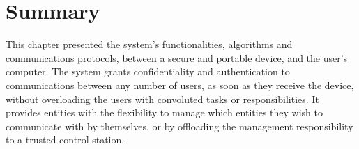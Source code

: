 


\section{Summary}\label{chap:arch:summary}

This chapter presented the system's functionalities, algorithms and communications protocols, between a secure and portable device, and the user's computer.
The system grants confidentiality and authentication to communications between any number of users, as soon as they receive the device, without overloading the users with convoluted tasks or responsibilities.
It provides entities with the flexibility to manage which entities they wish to communicate with by themselves, or by offloading the management responsibility to a trusted control station.
